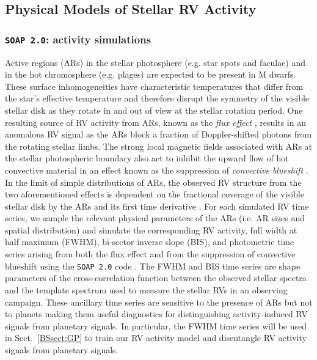 \subsection{Physical Models of Stellar RV Activity} \label{BSsect:activity}
\subsubsection{\texttt{SOAP 2.0}: activity simulations} \label{BSsect:soap}
Active regions (ARs) in the stellar photosphere (e.g. star spots and faculae) and in
the hot chromosphere (e.g. plages) are expected to be present in M dwarfs. These surface inhomogeneities
have characteristic temperatures that differ from the star's effective temperature and therefore 
disrupt the symmetry of the visible stellar disk as they rotate in and out of view at the stellar rotation
period. One resulting source of RV activity from ARs, known as the \emph{flux effect} \citep{dumusque14},
results in an anomalous RV signal as the ARs block a fraction of Doppler-shifted
photons from the rotating stellar limbs. The strong local magnetic fields associated with ARs
at the stellar photospheric boundary also act to inhibit the upward flow of hot convective material
in an effect known as the suppression of \emph{convective blueshift} \citep{dravins81}. \\

In the limit of simple distributions of ARs, the observed RV structure from the two aforementioned effects 
is dependent on the fractional coverage of the visible stellar disk by the ARs and its first time
derivative \citep{aigrain12}. For each simulated RV time series, we sample the relevant physical
parameters of the ARs (i.e. AR sizes and spatial distribution) and 
simulate the corresponding RV activity, full width at half maximum (FWHM), bi-sector inverse slope (BIS),
and photometric time series arising from both the flux effect and from the suppression of convective blueshift 
using the \texttt{SOAP 2.0} code \citep{dumusque14}. The FWHM and BIS time series are shape parameters of
the cross-correlation function between the observed stellar spectra and the template spectrum used to measure
the stellar RVs in an observing campaign. These ancillary time series are sensitive to the presence of ARs but not to planets
making them useful diagnostics for distinguishing activity-induced RV signals from planetary signals.
In particular, the FWHM time series will be used in
Sect.~\ref{BSsect:GP} to train our RV activity model and disentangle RV activity signals from planetary signals. \\

